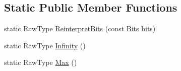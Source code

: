 \subsection*{Static Public Member Functions}
\begin{DoxyCompactItemize}
\item 
static Raw\+Type \hyperlink{classtesting_1_1internal_1_1FloatingPoint_ac551f793522e54fbd8a25acb79eac5b1}{Reinterpret\+Bits} (const \hyperlink{classtesting_1_1internal_1_1FloatingPoint_abf228bf6cd48f12c8b44c85b4971a731}{Bits} \hyperlink{classtesting_1_1internal_1_1FloatingPoint_aab053be914bdc9e507c0db89740c318c}{bits})
\item 
static Raw\+Type \hyperlink{classtesting_1_1internal_1_1FloatingPoint_a460027cc19cf01ae8e09cc3796b2b575}{Infinity} ()
\item 
static Raw\+Type \hyperlink{classtesting_1_1internal_1_1FloatingPoint_aae5954d8a57d3ff0987c6930cb68e114}{Max} ()
\end{DoxyCompactItemize}
